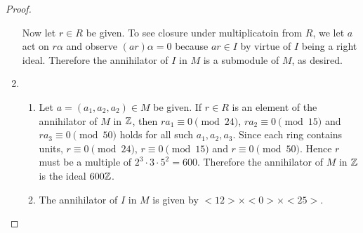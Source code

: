 \documentclass[10pt]{amsart}
\begin{document}
\begin{thm}
\begin{proof}
\begin{enumerate}
      Now let $r \in R$ be given.  
      To see closure under multiplicatoin from $R$, we let $a$ act on $r\alpha$ and observe $(ar)\alpha = 0$ because $ar \in I$ by virtue of $I$ being a right ideal.
      Therefore the annihilator of $I$ in $M$ is a submodule of $M$, as desired.
    \item
      \begin{enumerate}
      \item
        Let $a = (a_1, a_2, a_2) \in M$ be given.  
        If $r\in R$ is an element of the annihilator of $M$ in $\mathbb{Z}$, then $ra_1 \equiv 0 \pmod{24}$, $ra_2 \equiv 0 \pmod{15}$ and $ra_3 \equiv 0 \pmod{50}$ holds for all such $a_1,a_2,a_3$.
        Since each ring contains units, $r \equiv 0 \pmod{24}$, $r \equiv 0 \pmod{15}$ and $r \equiv 0 \pmod{50}$.
        Hence $r$ must be a multiple of $2^3\cdot 3\cdot 5^2 = 600$.
        Therefore the annihilator of $M$ in $\mathbb{Z}$ is the ideal $600\mathbb{Z}$.
      \item
        The annihilator of $I$ in $M$ is given by $<12>\times<0>\times<25>.$
      \end{enumerate}
    \end{enumerate}
  \end{proof}
\end{thm}
\end{document}
